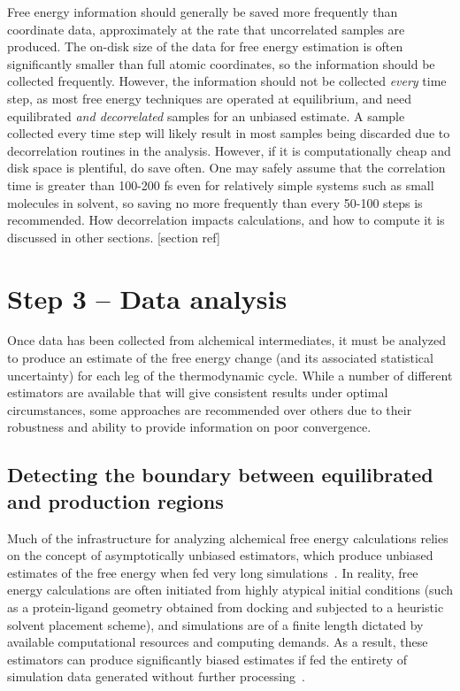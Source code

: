 \documentclass[9pt,bestpractices]{livecoms}
\begin{document}
Free energy information should generally be saved more frequently than coordinate data, approximately at the rate that uncorrelated samples are produced.  
The on-disk size of the data for free energy estimation is often significantly smaller than full atomic coordinates, so the information should be collected frequently. 
However, the information should not be collected \textit{every} time step, as most free energy techniques are operated at equilibrium, and need equilibrated \textit{and decorrelated} samples for an unbiased estimate.
A sample collected every time step will likely result in most samples being discarded due to decorrelation routines in the analysis. However, if it is computationally cheap and disk space is plentiful, do save often. One may safely assume that the correlation time is greater than 100-200 fs even for relatively simple systems such as small molecules in solvent, so saving no more frequently than every 50-100 steps is recommended. 
How decorrelation impacts calculations, and how to compute it is discussed in other sections.  [section ref]

\section{Step 3 -- Data analysis}
\label{sec:step3}

Once data has been collected from alchemical intermediates, it must be analyzed to produce an estimate of the free energy change (and its associated statistical uncertainty) for each leg of the thermodynamic cycle.
While a number of different estimators are available that will give consistent results under optimal circumstances, some approaches are recommended over others due to their robustness and ability to provide information on poor convergence.

\subsection{Detecting the boundary between equilibrated and production regions}
\label{sec:automatic-equilibration-detection}

Much of the infrastructure for analyzing alchemical free energy calculations relies on the concept of asymptotically unbiased estimators, which produce unbiased estimates of the free energy when fed very long simulations~\cite{shirts2005comparison}.
In reality, free energy calculations are often initiated from highly atypical initial conditions (such as a protein-ligand geometry obtained from docking and subjected to a heuristic solvent placement scheme), and simulations are of a finite length dictated by available computational resources and computing demands.
As a result, these estimators can produce significantly biased estimates if fed the entirety of simulation data generated without further processing~\cite{chodera2016simple}.
\end{document}
